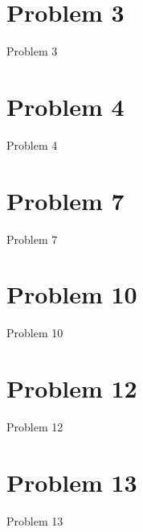 \documentclass[12pt, a4paper]{article}
\begin{document}
\maketitle



\vspace{-4cm}

\section{{Problem 3}}
        
		{Problem 3}
        
\section{{Problem 4}}
        
		{Problem 4}
		
\section{{Problem 7}}
        
		{Problem 7}
		
\section{{Problem 10}}
        
		{Problem 10}
		
\section{{Problem 12}}
		
		{Problem 12}

\section{{Problem 13}}
        
		{Problem 13}
\end{document}
